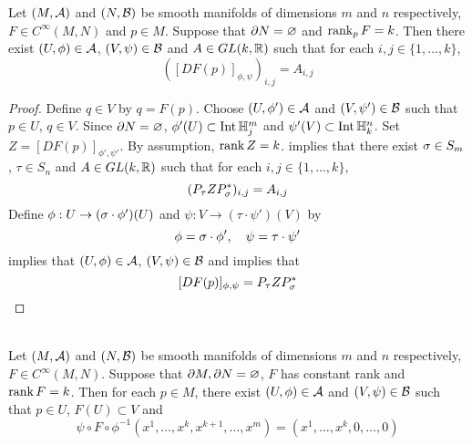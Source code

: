 \documentclass{book}
\begin{document}
	\begin{ex} 
		Let $(M, \mathcal{A})$ and $(N, \mathcal{B})$ be smooth manifolds of dimensions $m$ and $n$ respectively, $F \in C^{\infty}(M,N)$ and $p \in M$. Suppose that $\partial N = \varnothing$ and $\operatorname{\text{rank}}_p F = k$. Then there exist $(U, \phi) \in \mathcal{A}$, $(V, \psi) \in \mathcal{B}$ and $A \in GL(k, \mathbb{R})$ such that for each $i,j \in \{1, \ldots, k\}$, 
		$$([DF(p)]_{\phi, \psi})_{i,j} = A_{i,j} $$
	\end{ex}
	
	\begin{proof}
		Define $q \in V$ by $q = F(p)$. Choose $(U, \phi') \in \mathcal{A}$ and $(V, \psi') \in \mathcal{B}$ such that $p \in U$, $q \in V$. Since $\partial N = \varnothing$, $\phi'(U) \subset \operatorname{Int} \mathbb{H}^m_j$ and $\psi'(V) \subset \operatorname{Int} \mathbb{H}^n_k$. Set $Z = [DF(p)]_{\phi', \psi'}$. By assumption, $\operatorname{\text{rank}} Z = k$.  implies that there exist $\sigma \in S_{m}$, $\tau \in S_{n}$ and $A \in GL(k, \mathbb{R})$ such that for each $i,j \in \{1, \ldots, k\}$, 
		$$(P_{\tau} Z P_{\sigma}^*)_{i, j} = A_{i,j}$$
		Define $\phi: U \rightarrow (\sigma \cdot \phi')(U)$ and $\psi: V \rightarrow (\tau \cdot \psi')(V)$ by 
		$$\phi = \sigma \cdot \phi' , \quad \psi = \tau \cdot \psi'$$ 
		 implies that $(U, \phi) \in \mathcal{A}$, $(V, \psi) \in \mathcal{B}$ and  implies that
		$$[DF(p)]_{\phi, \psi} = P_{\tau} Z P_{\sigma}^*$$
	\end{proof}
	
	\begin{ex}   \\ 
			Let $(M, \mathcal{A})$ and $(N, \mathcal{B})$ be smooth manifolds of dimensions $m$ and $n$ respectively, $F \in C^{\infty}(M,N)$. Suppose that $\partial M, \partial N = \varnothing$, $F$ has constant rank and $\operatorname{\text{rank}} F = k$. Then for each $p \in M$, there exist $(U, \phi) \in \mathcal{A}$ and $(V, \psi) \in \mathcal{B}$ such that $p \in U$, $F(U) \subset V$ and
			$$\psi \circ F \circ \phi^{-1}(x^1, \ldots, x^k, x^{k+1}, \ldots, x^m) = (x^1, \ldots, x^k, 0, \ldots, 0)$$ 
			 
	\end{ex}
	
\end{document}
